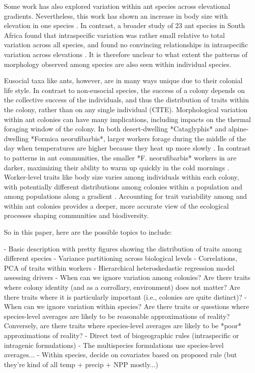 \documentclass[review,preprint,3p]{elsarticle}
\begin{document}
	Some work has also explored variation within ant species across elevational gradients. Nevertheless, this work has shown an increase in body size with elevation in one species \cite{Bernadou2016}. In contrast, a broader study of 23 ant species in South Africa found that intraspecific variation was rather small relative to total variation across all species, and found no convincing relationships in intraspecific variation across elevations \cite{Gaudard2019}. It is therefore unclear to what extent the patterns of morphology observed among species are also seen within individual species. 
	
	Eusocial taxa like ants, however, are in many ways unique due to their colonial life style. In contrast to non-eusocial species, the success of a colony depends on the collective success of the individuals, and thus the distribution of traits within the colony, rather than on any single individual (CITE). Morphological variation within ant colonies can have many implications, including impacts on the thermal foraging window of the colony. In both desert-dwelling *Cataglyphis* and alpine-dwelling *Formica neorufibarbis*, larger workers forage during the middle of the day when temperatures are higher because they heat up more slowly \cite{Cerda1997a,Bernstein1979}. In contrast to patterns in ant communities, the smaller *F. neorufibarbis* workers in are darker, maximizing their ability to warm up quickly in the cold mornings \cite{Bernstein1979}. Worker-level traits like body size varies among individuals within each colony, with potentially different distributions among colonies within a population and among populations along a gradient \cite{Frenette-Dussault2013,Wills2014,Chevalier2015}. Accounting for trait variability among and within ant colonies provides a deeper, more accurate view of the ecological processes shaping communities and biodiversity.
	
	So in this paper, here are the possible topics to include:  
	
	- Basic description with pretty figures showing the distribution of traits among different species  
	- Variance partitioning across biological levels  
	- Correlations, PCA of traits within workers  
	- Hierarchical heteroskedastic regression model assessing drivers  
	- When can we ignore variation among colonies? Are there traits where colony identity (and as a corrollary, environment) does not matter? Are there traits where it is particularly important (i.e., colonies are quite distinct)?  
	- When can we ignore variation within species? Are there traits or questions where species-level averages are likely to be reasonable approximations of reality? Conversely, are there traits where species-level averages are likely to be *poor* approximations of reality?  
	- Direct test of biogeographic rules (intraspecific or intragenic formulations)  
	- The multispecies formulations use species-level averages...  
	- Within species, decide on covariates based on proposed rule (but they're kind of all temp + precip + NPP mostly...)
	
\end{document}
